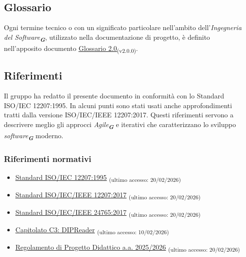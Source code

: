 \documentclass[a4paper,12pt]{article}
\newcommand{\glossario}[1]{\textit{#1}\textsubscript{\textbf{\textit{\textcolor{lightblack}{G}}}}}
\newcommand{\ped}[1]{\textsubscript{#1}}
\begin{document}
\subsection{Glossario}
Ogni termine tecnico o con un significato particolare nell'ambito
dell'\glossario{Ingegneria del Software}, utilizzato nella documentazione di
progetto, è definito nell'apposito documento
\href{https://7-zpus.github.io/Docs/assets/3_PB/DocumentiInterni/Glossario.pdf}{\ul{Glossario
        2.0}}\ped{(v2.0.0)}.
\subsection{Riferimenti}
Il gruppo ha redatto il presente documento in conformità con lo Standard
ISO/IEC 12207:1995. In alcuni punti sono stati usati anche approfondimenti
tratti dalla versione ISO/IEC/IEEE 12207:2017. Questi riferimenti servono a
descrivere meglio gli approcci \glossario{\textit{Agile}} e iterativi che
caratterizzano lo sviluppo \glossario{software} moderno.
\subsubsection{Riferimenti normativi}
\begin{itemize}
    \item \href{https://www.math.unipd.it/~tullio/IS-1/2009/Approfondimenti/ISO_12207-1995.pdf}{\ul{Standard ISO/IEC 12207:1995}} \ped{(ultimo accesso: 20/02/2026)}
    \item \href{https://www.iso.org/standard/63712.html}{\ul{Standard ISO/IEC/IEEE 12207:2017}} \ped{(ultimo accesso: 20/02/2026)}
    \item \href{https://www.iso.org/standard/71952.html}{\ul{Standard ISO/IEC/IEEE 24765:2017}} \ped{(ultimo accesso: 20/02/2026)}
    \item \href{https://www.math.unipd.it/~tullio/IS-1/2025/Progetto/C3.pdf}{\ul{Capitolato C3: DIPReader}} \ped{(ultimo accesso: 10/02/2026)}
    \item \href{https://www.math.unipd.it/~tullio/IS-1/2025/Dispense/PD1.pdf}{\ul{Regolamento di Progetto Didattico a.a.
                  2025/2026}} \ped{(ultimo accesso: 20/02/2026)}
\end{itemize}
\end{document}
